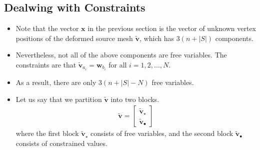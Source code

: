 \documentclass[10pt]{article}
\newcommand{\ve}[1]{\mathbf{#1}}
\begin{document}
\subsection{Dealwing with Constraints}
\begin{itemize}
    \item Note that the vector $\ve{x}$ in the previous section is the vector of unknown vertex positions of the deformed source mesh $\widetilde{\ve{v}}$, which has $3(n + |S|)$ components.

    \item Nevertheless, not all of the above components are free variables. The constraints are that $\widetilde{\ve{v}}_{a_i} = \ve{w}_{b_i}$ for all $i = 1, 2, \ldots, N$.
    
    \item As a result, there are only $3(n + |S| - N)$ free variables.
    
    \item Let us say that we partition $\widetilde{\ve{v}}$ into two blocks.
    \begin{align*}
        \widetilde{\ve{v}} = \begin{bmatrix} \widetilde{\ve{v}}_{\star} \\ \widetilde{\ve{v}}_{\bullet} \end{bmatrix}
    \end{align*}
    where the first block $\widetilde{\ve{v}}_{\star}$ consists of free variables, and the second block $\widetilde{\ve{v}}_{\bullet}$ consists of constrained values.


\end{itemize}
\end{document}
